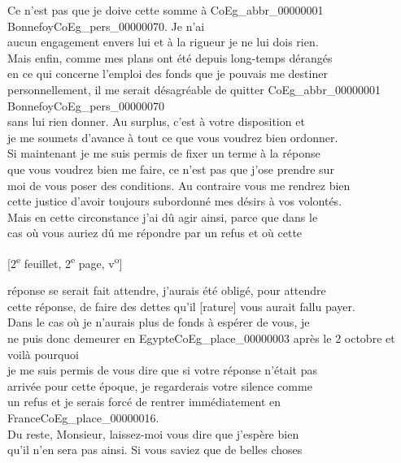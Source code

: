 \documentclass{book}
\begin{document}
Ce n’est pas que je doive cette somme à \gls{CoEg_abbr_00000001} Bonnefoy\gls{CoEg_pers_00000070}. Je n’ai\\
aucun engagement envers lui et à la rigueur je ne lui dois rien.\\
Mais enfin, comme mes plans ont été depuis long-temps dérangés\\
en ce qui concerne l’emploi des fonds que je pouvais me destiner\\
personnellement, il me serait désagréable de quitter \gls{CoEg_abbr_00000001} Bonnefoy\gls{CoEg_pers_00000070}\\
sans lui rien donner. Au surplus, c’est à votre disposition et\\
je me soumets d’avance à tout ce que vous voudrez bien ordonner.\\
\indent Si maintenant je me suis permis de fixer un terme à la réponse\\
que vous voudrez bien me faire, ce n’est pas que j’ose prendre sur\\
moi de vous poser des conditions. Au contraire vous me rendrez bien\\
cette justice d’avoir toujours subordonné mes désirs à vos volontés.\\
Mais en cette circonstance j’ai dû agir ainsi, parce que dans le\\
cas où vous auriez dû me répondre par un refus et où cette
{\footnotesize\begin{center} {[2\textsuperscript{e} feuillet, 2\textsuperscript{e} page, v\textsuperscript{o}]}\end{center}}
\noindent réponse se serait fait attendre, j’aurais été obligé, pour attendre\\
cette réponse, de faire des dettes qu’il [rature] vous aurait fallu payer.\\
Dans le cas où je n’aurais plus de fonds à espérer de vous, je\\
ne puis donc demeurer en Egypte\gls{CoEg_place_00000003} après le 2 octobre et voilà pourquoi\\
je me suis permis de vous dire que si votre réponse n’était pas\\
arrivée pour cette époque, je regarderais votre silence comme\\
un refus et je serais forcé de rentrer immédiatement en France\gls{CoEg_place_00000016}.\\
\indent Du reste, Monsieur, laissez-moi vous dire que j’espère bien\\
qu’il n’en sera pas ainsi. Si vous saviez que de belles choses\\
\end{document}

